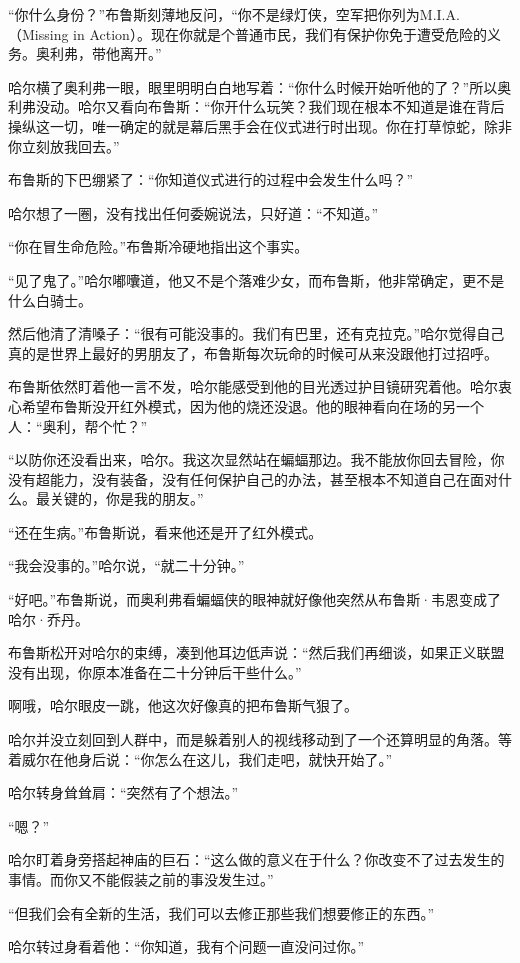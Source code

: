 \documentclass[../main]{subfiles}
\begin{document}
“你什么身份？”布鲁斯刻薄地反问，“你不是绿灯侠，空军把你列为M.I.A.（Missing
in
Action）。现在你就是个普通市民，我们有保护你免于遭受危险的义务。奥利弗，带他离开。”

哈尔横了奥利弗一眼，眼里明明白白地写着：“你什么时候开始听他的了？”所以奥利弗没动。哈尔又看向布鲁斯：“你开什么玩笑？我们现在根本不知道是谁在背后操纵这一切，唯一确定的就是幕后黑手会在仪式进行时出现。你在打草惊蛇，除非你立刻放我回去。”

布鲁斯的下巴绷紧了：“你知道仪式进行的过程中会发生什么吗？”

哈尔想了一圈，没有找出任何委婉说法，只好道：“不知道。”

“你在冒生命危险。”布鲁斯冷硬地指出这个事实。

“见了鬼了。”哈尔嘟囔道，他又不是个落难少女，而布鲁斯，他非常确定，更不是什么白骑士。

然后他清了清嗓子：“很有可能没事的。我们有巴里，还有克拉克。”哈尔觉得自己真的是世界上最好的男朋友了，布鲁斯每次玩命的时候可从来没跟他打过招呼。

布鲁斯依然盯着他一言不发，哈尔能感受到他的目光透过护目镜研究着他。哈尔衷心希望布鲁斯没开红外模式，因为他的烧还没退。他的眼神看向在场的另一个人：“奥利，帮个忙？”

“以防你还没看出来，哈尔。我这次显然站在蝙蝠那边。我不能放你回去冒险，你没有超能力，没有装备，没有任何保护自己的办法，甚至根本不知道自己在面对什么。最关键的，你是我的朋友。”

“还在生病。”布鲁斯说，看来他还是开了红外模式。

“我会没事的。”哈尔说，“就二十分钟。”

“好吧。”布鲁斯说，而奥利弗看蝙蝠侠的眼神就好像他突然从布鲁斯·韦恩变成了哈尔·乔丹。

布鲁斯松开对哈尔的束缚，凑到他耳边低声说：“然后我们再细谈，如果正义联盟没有出现，你原本准备在二十分钟后干些什么。”

啊哦，哈尔眼皮一跳，他这次好像真的把布鲁斯气狠了。

哈尔并没立刻回到人群中，而是躲着别人的视线移动到了一个还算明显的角落。等着威尔在他身后说：“你怎么在这儿，我们走吧，就快开始了。”

哈尔转身耸耸肩：“突然有了个想法。”

“嗯？”

哈尔盯着身旁搭起神庙的巨石：“这么做的意义在于什么？你改变不了过去发生的事情。而你又不能假装之前的事没发生过。”

“但我们会有全新的生活，我们可以去修正那些我们想要修正的东西。”

哈尔转过身看着他：“你知道，我有个问题一直没问过你。”
\end{document}
